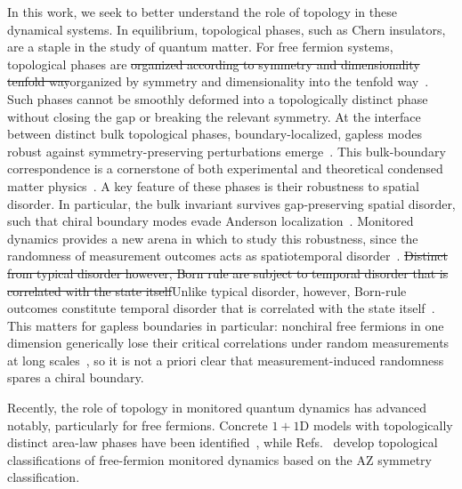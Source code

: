 \documentclass[aps,prb,10pt,twocolumn,superscriptaddress,longbibliography,floatfix]{revtex4-2}
\newcommand{\claudeadd}[1]{{\color{orange}#1}}
\newcommand{\claudedel}[1]{{\color{orange}\sout{#1}}}
\begin{document}
In this work, we seek to better understand the role of topology in these dynamical systems. In equilibrium, topological phases, such as Chern insulators, are a staple in
the study of quantum matter. For free fermion systems, topological phases are \claudedel{organized according to symmetry and dimensionality tenfold way}\claudeadd{organized by symmetry and dimensionality into the tenfold way}~\cite{AltlandZirnbauer1997,SchnyderRyuFurusakiLudwig2008,Kitaev2009,RyuSchnyderFurusakiLudwig2010,ChiuTeoSchnyderRyu2016}.
Such phases cannot be smoothly deformed into a topologically distinct phase without closing the gap or breaking the relevant symmetry. At the interface between distinct bulk topological phases, boundary-localized, gapless modes robust against symmetry-preserving
perturbations emerge~\cite{Halperin1982,Hatsugai1993,TeoKane2010}. This bulk-boundary correspondence is a cornerstone of both experimental and theoretical condensed matter physics~\cite{HasanKane2010,QiZhang2011}. A key feature of these phases is their robustness to spatial disorder. In particular, the bulk invariant survives gap-preserving spatial disorder, such that chiral boundary modes 
evade Anderson localization~\cite{Halperin1982,EversMirlin2008}. Monitored dynamics provides a new arena in which to study this robustness, since the randomness of measurement outcomes acts as spatiotemporal disorder~\cite{JianBauerKeselmanLudwig2022}. \claudedel{Distinct from typical disorder however, Born rule are subject to temporal disorder that is correlated with the state itself}\claudeadd{Unlike typical disorder, however, Born-rule outcomes constitute temporal disorder that is correlated with the state itself}~\cite{JianShapourianBauerLudwig2023,FavaEtAl2023}. \claudeadd{This matters for gapless boundaries in particular: nonchiral free fermions in one dimension generically lose their critical correlations under random measurements at long scales~\cite{PoboikoEtAl2023}, so it is not a priori clear that measurement-induced randomness spares a chiral boundary.}

Recently, the role of topology in monitored quantum dynamics has advanced notably, particularly for free fermions. Concrete $1+1$D models with topologically distinct area-law phases have been identified~\cite{KellsMeidanRomito2023,BehrendsVennBeri2024,PanShapourianJian2025,Oshima2025, yang2026decoding}, while Refs.~\cite{BhuiyanPanJian2026,XiaoKawabata2026} develop topological classifications of free-fermion monitored dynamics based on the AZ symmetry classification.
\end{document}
